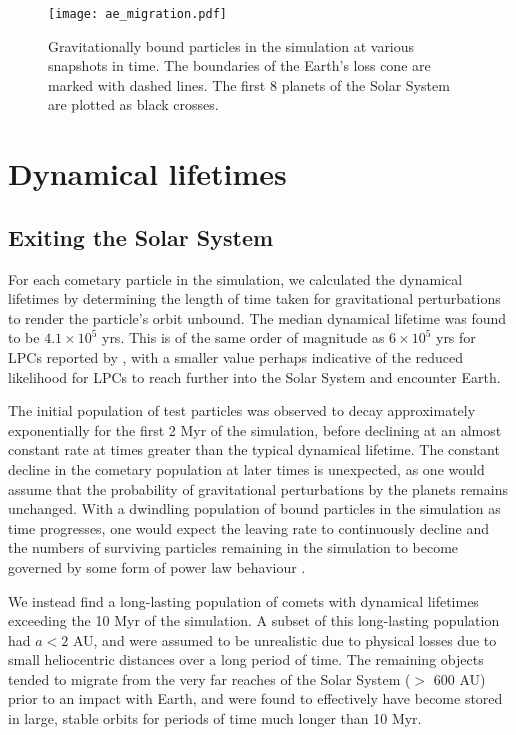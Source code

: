 
\begin{figure}[t!]
    \centering
    \texttt{[image: ae\_migration.pdf]}
    \caption[Particle migration from the Earth-Moon system]{Gravitationally bound particles in the simulation at various snapshots in time. The boundaries of the Earth's loss cone are marked with dashed lines. The first 8 planets of the Solar System are plotted as black crosses.}
    \label{fig:migration}
\end{figure}

\section{Dynamical lifetimes}

\subsection{Exiting the Solar System}
\label{sec:exiting}

For each cometary particle in the simulation, we calculated the dynamical lifetimes by determining the length of time taken for gravitational perturbations to render the particle's orbit unbound. The median dynamical lifetime was found to be $4.1\times10^5$ yrs. This is of the same order of magnitude as $6\times10^5$ yrs for LPCs reported by \cite{1979IAUS...81..277W}, with a smaller value perhaps indicative of the reduced likelihood for LPCs to reach further into the Solar System and encounter Earth.

The initial population of test particles was observed to decay approximately exponentially for the first 2 Myr of the simulation, before declining at an almost constant rate at times greater than the typical dynamical lifetime. The constant decline in the cometary population at later times is unexpected, as one would assume that the probability of gravitational perturbations by the planets remains unchanged. With a dwindling population of bound particles in the simulation as time progresses, one would expect the leaving rate to continuously decline and the numbers of surviving particles remaining in the simulation to become governed by some form of power law behaviour \citep{1996ASPC..107..233D}. 

We instead find a long-lasting population of comets with dynamical lifetimes exceeding the 10 Myr of the simulation. A subset of this long-lasting population had $a < 2$ AU, and were assumed to be unrealistic due to physical losses due to small heliocentric distances over a long period of time. The remaining objects tended to migrate from the very far reaches of the Solar System ($>$ 600 AU) prior to an impact with Earth, and were found to effectively have become stored in large, stable orbits for periods of time much longer than 10 Myr. 

